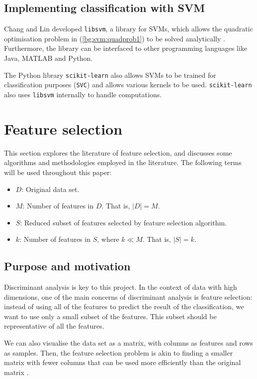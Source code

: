 \documentclass[12pt, twoside, a4paper]{report}
\begin{document}
\subsection{Implementing classification with SVM}
Chang and Lin \cite{libsvm} developed \texttt{libsvm}, a library for SVMs, which allows the quadratic optimisation problem in (\ref{bg:svm:quadprob1}) to be solved analytically \cite{RefWorks:126}. Furthermore, the library can be interfaced to other programming languages like Java, MATLAB and Python.

The Python library \texttt{scikit-learn} also allows SVMs to be trained for classification purposes (\texttt{SVC}) and allows various kernels to be used. \texttt{scikit-learn} also uses \texttt{libsvm} internally to handle computations.

\section{Feature selection} \label{bg:feature_selection}

This section explores the literature of feature selection, and discusses some algorithms and methodologies employed in the literature. The following terms will be used throughout this paper:
\begin{itemize}
  \item $D$: Original data set.
  \item $M$: Number of features in $D$. That is, $|D| = M$.
  \item $S$: Reduced subset of features selected by feature selection algorithm.
  \item $k$: Number of features in $S$, where $k \ll M$. That is, $|S| = k$.
\end{itemize}

\subsection{Purpose and motivation} \label{bg:fs:purpose}

Discriminant analysis is key to this project. In the context of data with high dimensions, one of the main concerns of discriminant analysis is feature selection: instead of using all of the features to predict the result of the classification, we want to use only a small subset of the features. This subset should be representative of all the features.

We can also visualise the data set as a matrix, with columns as features and rows as samples. Then, the feature selection problem is akin to finding a smaller matrix with fewer columns that can be used more efficiently than the original matrix \cite{RefWorks:163}.
\end{document}
